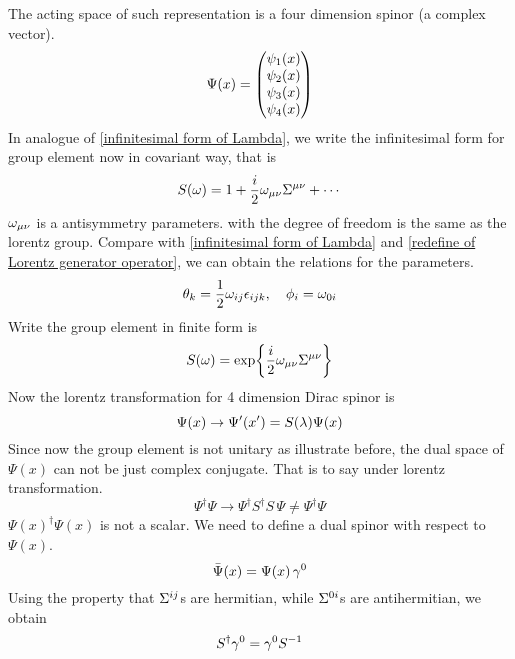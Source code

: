 The acting space of such representation is a four dimension spinor (a complex vector).
\begin{equation}
\Psi(x) = \mqty(\psi_1(x)\\ \psi_2(x)\\ \psi_3(x)\\ \psi_4(x))
\end{equation}
In analogue of \eqref{infinitesimal form of Lambda}, we write the infinitesimal form for group element now in covariant way, that is 
\begin{equation}\label{the infinitesimal form of Sla}
S(\omega) = 1+ \frac{i}{2}\omega_{\mu\nu}\Sigma^{\mu\nu}+\cdots
\end{equation}
$\omega_{\mu\nu}$ is a antisymmetry parameters. with the degree of freedom is the same as the lorentz group. Compare with \eqref{infinitesimal form of Lambda} and \eqref{redefine of Lorentz generator operator}, we can obtain the relations for the parameters.
\begin{equation}\label{parameter redefinition}
\theta_k = \frac{1}{2} \omega_{ij}\epsilon_{ijk}, \quad \phi_i = \omega_{0i}
\end{equation}
Write the group element in finite form is 
\begin{equation}\label{the finite form of Sla}
S(\omega) = \exp{\frac{i}{2}\omega_{\mu\nu}\Sigma^{\mu\nu}}
\end{equation}
Now the lorentz transformation for 4 dimension Dirac spinor  is
\begin{equation}\label{lorentz transformation of Dirac spinor}
\Psi(x)\rightarrow\Psi'(x') = S(\lambda)\Psi(x)
\end{equation}
Since now the group element is not unitary as illustrate before, the dual space of $\Psi(x)$ can not be just complex conjugate. That is to say under lorentz  transformation.
\begin{equation}
\Psi^{\dagger} \Psi 
\rightarrow 
\Psi^{\dagger} S^{\dagger} S \, \Psi \neq \Psi^{\dagger} \Psi
\end{equation}
$\Psi(x)^{\dagger} \Psi(x) $ is not a scalar.
We need to define a dual spinor with respect to $\Psi(x)$.
\begin{equation}\label{definition of dual spinor}
\bar{\Psi}(x) = \Psi(x)\,\gamma^0
\end{equation}
Using the property that $\Sigma^{ij}$s are hermitian, while $\Sigma^{0i}$s are antihermitian, we obtain
\begin{equation}\label{property of S(lambda)}
S^{\dagger} \gamma^0 = \gamma^0 S^{-1}
\end{equation}
